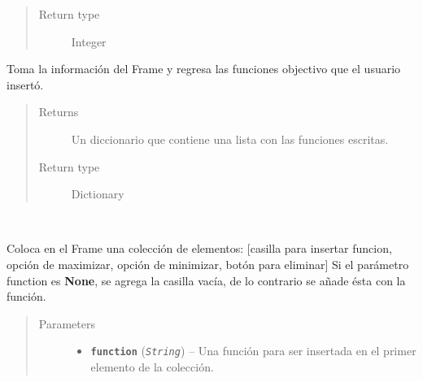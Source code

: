 \documentclass[class=report, crop=false]{standalone}
\begin{document}
\begin{fulllineitems}
\begin{fulllineitems}
\begin{quote}
\begin{description}
\item[{Return type}] \leavevmode
Integer
\end{description}\end{quote}

\end{fulllineitems}

\begin{fulllineitems}

Toma la información del Frame y regresa las funciones 
objectivo que el usuario insertó.

\begin{quote}\begin{description}
\item[{Returns}] \leavevmode
Un diccionario que contiene una lista con las funciones escritas.
\item[{Return type}] \leavevmode
Dictionary
\end{description}\end{quote}

\end{fulllineitems}

\begin{fulllineitems}

~
\vspace{-0.3cm}

Coloca en el Frame una colección de elementos:\break
{[}casilla para insertar funcion, opción de maximizar, opción de minimizar, botón para eliminar{]}\break
Si el parámetro function es \textbf{None}, se agrega la casilla 
vacía, de lo contrario se añade ésta con la función.

\begin{quote}\begin{description}
\item[{Parameters}] \leavevmode\begin{itemize}
\item \textbf{\texttt{function}} (\emph{\texttt{String}}) -- Una función para ser insertada en el primer elemento de la colección.
\end{itemize}
\end{description}\end{quote}

\end{fulllineitems}


\end{fulllineitems}
\end{document}
